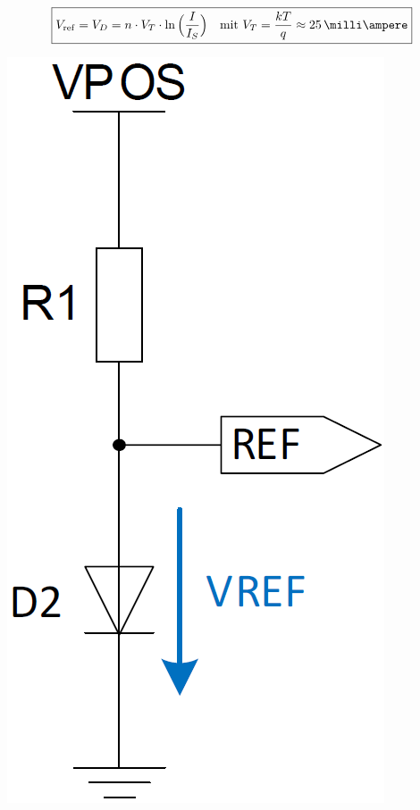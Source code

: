     $$ \boxed{ V_{\rm ref} = V_D = n \cdot V_T \cdot \ln \Big( \frac{I}{I_S} \Big) 
    \quad \text{mit } V_T =\frac{k T}{q} \approx 25 \, \milli \ampere } $$
\begin{minipage}[c]{0.2\columnwidth}
    \includegraphics[width=\columnwidth]{images/diodenreferenz.png}
\end{minipage}
